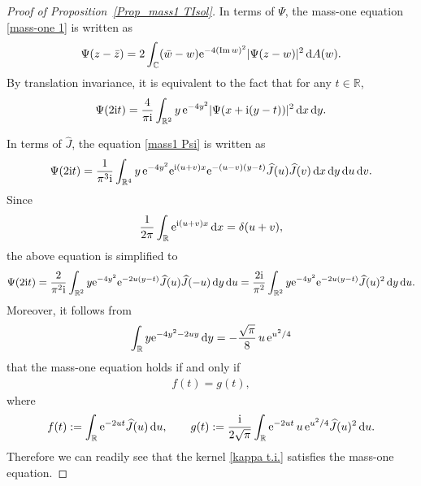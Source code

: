 \documentclass[pdftex]{sigma}
\numberwithin{equation}{section}
\newcommand{\R}{{\mathbb R}}
\newcommand{\C}{{\mathbb C}}
\newcommand{\im}{\operatorname{Im}}
\newcommand{\1}{\chi}
\def\wh{\widehat}
\begin{document}
\begin{proof}[Proof of Proposition~\ref{Prop_mass1 TIsol}]
	In terms of $\Psi$, the mass-one equation \eqref{mass-one 1} is written as
	\begin{gather*}
		\Psi(z-\bar{z})=2 \int_{ \C } (\bar{w}-w) {\rm e}^{-4(\im w)^2} |\Psi(z-w)|^2\,{\rm d}A(w).
	\end{gather*}
	By translation invariance, it is equivalent to the fact that for any $t \in \R$,
	\begin{gather} \label{mass1 Psi}
			\Psi(2{\rm i}t)
			=\frac{4}{\pi {\rm i}} \int_{ \R^2 } y \, {\rm e}^{-4y^2} |\Psi( x+{\rm i}(y-t) )|^2\,{\rm d}x\,{\rm d}y.
	\end{gather}
	
	In terms of $\wh{J}$, the equation \eqref{mass1 Psi} is written as
	\begin{gather*}
			\Psi(2{\rm i}t)
			=\frac{1}{\pi^3{\rm i}} \int_{ \R^4 } y \, {\rm e}^{-4y^2} {\rm e}^{{\rm i}(u+v)x} {\rm e}^{-(u-v)(y-t)} \wh{J}(u) \wh{J}(v)\,{\rm d}x\,{\rm d}y\,{\rm d}u\,{\rm d}v .
	\end{gather*}
	Since
	\begin{gather*}
	\frac{1}{2\pi } \int_\R {\rm e}^{{\rm i}(u+v)x}\,{\rm d}x=\delta(u+v),
	\end{gather*}
	the above equation is simplified to
	\begin{gather*}
			\Psi(2{\rm i}t)=\frac{2}{\pi^2{\rm i}} \int_{ \R^2 } y {\rm e}^{-4y^2} {\rm e}^{-2u(y-t)} \wh{J}(u) \wh{J}(-u)\,{\rm d}y\,{\rm d}u
		= \frac{2{\rm i}}{\pi^2} \int_{ \R^2 } y {\rm e}^{-4y^2} {\rm e}^{-2u(y-t)} \wh{J}(u)^2\,{\rm d}y\,{\rm d}u.
		\end{gather*}
	Moreover, it follows from
	\begin{gather*}
		\int_{\R} y {\rm e}^{-4y^2-2uy}\,{\rm d}y=-\frac{\sqrt{\pi}}{8} \, u \, {\rm e}^{u^2/4}
	\end{gather*}
	that the mass-one equation holds if and only if
	\begin{gather} \label{mass1 var1}
		f(t)=g(t),
	\end{gather}
	where
	\begin{gather*}
		f(t):=\int_{\R} {\rm e}^{-2ut} \wh{J}(u)\,{\rm d}u,
		\qquad
		g(t):=\frac{{\rm i}}{2\sqrt{\pi} } \int_{ \R } {\rm e}^{-2ut} \, u \, {\rm e}^{u^2/4} \wh{J}(u)^2\,{\rm d}u.
	\end{gather*}
	Therefore we can readily see that the kernel \eqref{kappa t.i.} satisfies the mass-one equation.
	

\end{proof}
\end{document}
